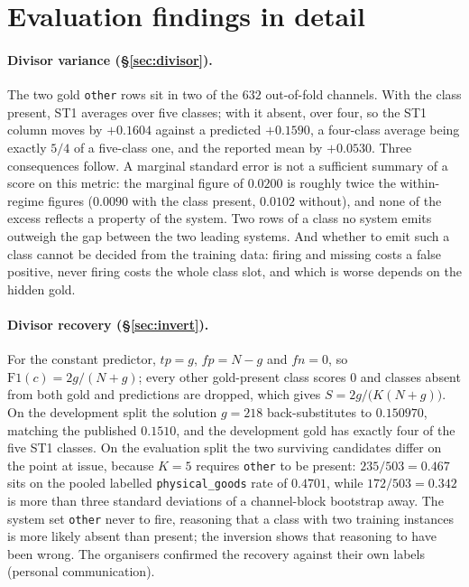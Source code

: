 \documentclass[11pt]{article}
\newcommand{\lab}[1]{\texttt{\small #1}}
\begin{document}
\section{Evaluation findings in detail}
\label{app:evaluation}

\paragraph{Divisor variance (\S\ref{sec:divisor}).}
The two gold \lab{other} rows sit in two of the $632$ out-of-fold channels. With the class
present, ST1 averages over five classes; with it absent, over four, so the ST1 column moves by
$+0.1604$ against a predicted $+0.1590$, a four-class average being exactly $5/4$ of a
five-class one, and the reported mean by $+0.0530$. Three consequences follow. A marginal
standard error is not a sufficient summary of a score on this metric: the marginal figure of
$0.0200$ is roughly twice the within-regime figures ($0.0090$ with the class present, $0.0102$
without), and none of the excess reflects a property of the system. Two rows of a class no system emits outweigh the gap between the two leading
systems. And whether to emit such a class cannot be decided from the training data: firing and
missing costs a false positive, never firing costs the whole class slot, and which is worse
depends on the hidden gold.

\paragraph{Divisor recovery (\S\ref{sec:invert}).}
For the constant predictor, $tp=g$, $fp=N-g$ and $fn=0$, so $\mathrm{F1}(c)=2g/(N+g)$; every
other gold-present class scores $0$ and classes absent from both gold and predictions are
dropped, which gives $S=2g/\bigl(K(N+g)\bigr)$. On the development split the solution $g=218$
back-substitutes to $0.150970$, matching the published $0.1510$, and the development gold has
exactly four of the five ST1 classes. On the evaluation split the two surviving candidates
differ on the point at issue, because $K=5$ requires \lab{other} to be present: $235/503=0.467$
sits on the pooled labelled \lab{physical\_goods} rate of $0.4701$, while $172/503=0.342$ is
more than three standard deviations of a channel-block bootstrap away. The system set
\lab{other} never to fire, reasoning that a class with two training instances is more likely
absent than present; the inversion shows that reasoning to have been wrong. The organisers
confirmed the recovery against their own labels (personal communication).
\end{document}
